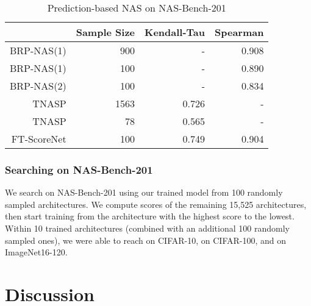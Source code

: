 \documentclass[lettersize,journal]{IEEEtran}
\begin{document}
            \begin{table} 
                \caption{Prediction-based NAS on NAS-Bench-201}
                \label{tab:SAC_Prediction}
                \centering
                \begin{tabular}{r|rrr}
                \toprule
                    & Sample Size & Kendall-Tau & Spearman\\
                    \midrule
                    BRP-NAS(1) \cite{BRP-NAS} & 900 & - & 0.908 \\
                    BRP-NAS(1) \cite{BRP-NAS} & 100 & - & 0.890 \\
                    BRP-NAS(2) \cite{BRP-NAS} & 100 & - & 0.834 \\
                    TNASP \cite{TNASP} & 1563 & 0.726 & - \\
                    TNASP \cite{TNASP} & 78 & 0.565 & - \\
                    FT-ScoreNet & 100 & 0.749 & 0.904 \\
                \bottomrule
            \end{tabular}
            \end{table}
            
        \subsubsection{Searching on NAS-Bench-201}
            We search on NAS-Bench-201 using our trained model from 100 randomly sampled architectures. We compute scores of the remaining 15,525 architectures, then start training from the architecture with the highest score to the lowest. Within 10 trained architectures (combined with an additional 100 randomly sampled ones), we were able to reach  on CIFAR-10,  on CIFAR-100, and  on ImageNet16-120.

\section{Discussion} \label{sec:discussion}
\end{document}
